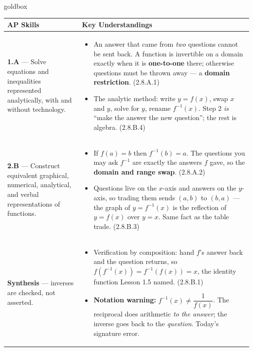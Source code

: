 \documentclass[10pt]{article}
\begin{document}
\renewcommand{\arraystretch}{1.6}
\begin{skillbox}{goldbox}
\begin{tabularx}{\linewidth}{@{}X X@{}}
\textbf{AP Skills} &
\textbf{Key Understandings} \\
\midrule
\textbf{1.A} --- Solve equations and inequalities represented analytically,
with and without technology. &
\begin{itemize}[leftmargin=1.2em,itemsep=2pt,topsep=0pt]
  \item An answer that came from \textit{two} questions cannot be sent back.
        A function is invertible on a domain exactly when it is
        \textbf{one-to-one} there; otherwise questions must be thrown away ---
        a \textbf{domain restriction}. (2.8.A.1)
  \item The analytic method: write $y = f(x)$, swap $x$ and $y$, solve for $y$,
        rename $f^{-1}(x)$. Step 2 \textit{is} ``make the answer the new
        question''; the rest is algebra. (2.8.B.4)
\end{itemize} \\
\textbf{2.B} --- Construct equivalent graphical, numerical, analytical, and
verbal representations of functions. &
\begin{itemize}[leftmargin=1.2em,itemsep=2pt,topsep=0pt]
  \item If $f(a) = b$ then $f^{-1}(b) = a$. The questions you may ask $f^{-1}$
        are exactly the answers $f$ gave, so the \textbf{domain and range
        swap}. (2.8.A.2)
  \item Questions live on the $x$-axis and answers on the $y$-axis, so trading
        them sends $(a,b)$ to $(b,a)$ --- the graph of $y = f^{-1}(x)$ is the
        reflection of $y = f(x)$ over $y = x$. Same fact as the table trade.
        (2.8.B.3)
\end{itemize} \\
\textbf{Synthesis} --- inverses are checked, not asserted. &
\begin{itemize}[leftmargin=1.2em,itemsep=2pt,topsep=0pt]
  \item Verification by composition: hand $f$'s answer back and the question
        returns, so $f(f^{-1}(x)) = f^{-1}(f(x)) = x$, the identity function
        Lesson 1.5 named. (2.8.B.1)
  \item \textbf{Notation warning:} $f^{-1}(x) \ne \dfrac{1}{f(x)}$. The
        reciprocal does arithmetic \textit{to the answer}; the inverse goes back
        to the \textit{question}. Today's signature error.
\end{itemize} \\
\end{tabularx}
\end{skillbox}
\end{document}
